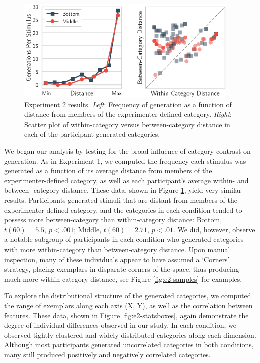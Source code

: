 \documentclass[pdflatex,sn-apa]{sn-jnl}%
\theoremstyle{thmstyleone}%
\theoremstyle{thmstyletwo}%
\theoremstyle{thmstylethree}%
\begin{document}
\begin{figure}
    \begin{center} \includegraphics[width=0.95\textwidth]{figs/e2-distanceplots.eps}
    \caption{Experiment 2 results. {\em Left}: Frequency of generation as a
function of distance from members of the experimenter-defined category. {\em
Right}: Scatter plot of within-category versus between-category distance in each
of the participant-generated categories.}
    \label{fig:e2-distanceplots}
    \end{center}
\end{figure}

We began our analysis by testing for the broad influence of category contrast on
generation. As in Experiment 1, we computed the frequency each stimulus was
generated as a function of its average distance from members of the
experimenter-defined category, as well as each participant's average within- and
between- category distance. These data, shown in Figure
\ref{fig:e2-distanceplots}, yield very similar results. Participants generated
stimuli that are distant from members of the experimenter-defined category, and
the categories in each condition tended to possess more between-category than
within-category distance: Bottom, $t(60) = 5.5$, $p < .001$; Middle, $t(60) =
2.71$, $p < .01$. We did, however, observe a notable subgroup of participants
in each condition who generated categories with more within-category than
between-category distance. Upon manual inspection, many of these individuals
appear to have assumed a `Corners' strategy, placing exemplars in disparate
corners of the space, thus producing much more within-category distance, see
Figure \ref{fig:e2-samples} for examples.

To explore the distributional structure of the generated categories, we computed
the range of exemplars along each axis (X, Y), as well as the correlation
between features. These data, shown in Figure \ref{fig:e2-statsboxes}, again
demonstrate the degree of individual differences observed in our study. In each
condition, we observed tightly clustered and widely distributed categories along
each dimension. Although most participants generated uncorrelated categories in
both conditions, many still produced positively and negatively correlated
categories.
\end{document}
